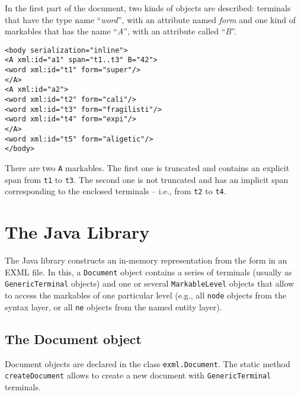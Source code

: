 \documentclass[a4paper,11pt]{report}
\begin{document}
In the first part of the document, two kinds of objects are described: terminals that have the
type name ``\emph{word}'', with an attribute named \emph{form} 
and one kind of markables that has the name ``\emph{A}'', with
an attribute called ``\emph{B}''.

\begin{verbatim}
<body serialization="inline">
<A xml:id="a1" span="t1..t3" B="42">
<word xml:id="t1" form="super"/>
</A>
<A xml:id="a2">
<word xml:id="t2" form="cali"/>
<word xml:id="t3" form="fragilisti"/>
<word xml:id="t4" form="expi"/>
</A>
<word xml:id="t5" form="aligetic"/>
</body>
\end{verbatim}
There are two \texttt{A} markables. The first one is truncated and contains an
explicit span from \texttt{t1} to \texttt{t3}. The second one is not truncated
and has an implicit span corresponding to the enclosed terminals -- i.e., from
\texttt{t2} to \texttt{t4}.

\chapter{The Java Library}
The Java library constructs an in-memory representation from the form in an EXML
file. In this, a \texttt{Document} object contains a series of terminals (usually
as \texttt{GenericTerminal} objects) and one or several \texttt{MarkableLevel}
objects that allow to access the markables of one particular level (e.g.,
all \texttt{node} objects from the syntax layer, or all \texttt{ne}
objects from the named entity layer).

\section{The Document object}
Document objects are declared in the class \texttt{exml.Document}. The static method
\texttt{createDocument} allows to create a new document with \texttt{GenericTerminal}
terminals.
\end{document}
